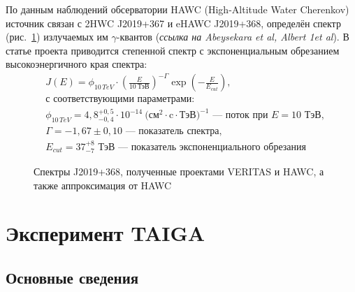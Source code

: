\documentclass[magd,floatypics,numeref]{msudipl} %
\begin{document}
По данным наблюдений обсерватории HAWC (High-Altitude Water Cherenkov) источник связан с 2HWC J2019+367 и eHAWC J2019+368, определён спектр (рис.~\ref{pic:HAWCJ2019368Spectra}) \afterpage{\clearpage} излучаемых им $\gamma$-квантов (\textit{ссылка на Abeysekara et al, Albert 1et al}). В статье проекта приводится степенной спектр с экспоненциальным обрезанием высокоэнергичного  края спектра:
\[
\begin{aligned}
&J(E)=\phi_{10\,TeV} \cdot\left(\frac{E}{10~\text{ТэВ}}\right)^{-\Gamma} \exp \left(-\frac{E}{E_{cut}}\right),\\
&\text{с соответствующими параметрами:}\\
&\phi_{10\,TeV} = 4,\!8^{+0{,}5}_{-0{,}4}\cdot 10^{-14}~\text{($\text{см}^2\cdot \text{c}\cdot \text{ТэВ})^{-1}$ --- поток при $E = 10$~ТэВ},\\
&\Gamma=-1{,}67\pm 0,\!10 \text{ --- показатель спектра},\\
&E_{cut} = 37^{+8}_{-7} \text{ ТэВ --- показатель экспоненциального обрезания}
\end{aligned}
\]

\begin{figure}[b]
	\noindent{}
	\caption{Спектры J2019+368, полученные проектами VERITAS и HAWC, а также аппроксимация от HAWC}
	\label{pic:HAWCJ2019368Spectra}
\end{figure}

\chapter{Эксперимент TAIGA}
\section{Основные сведения}
\end{document}
